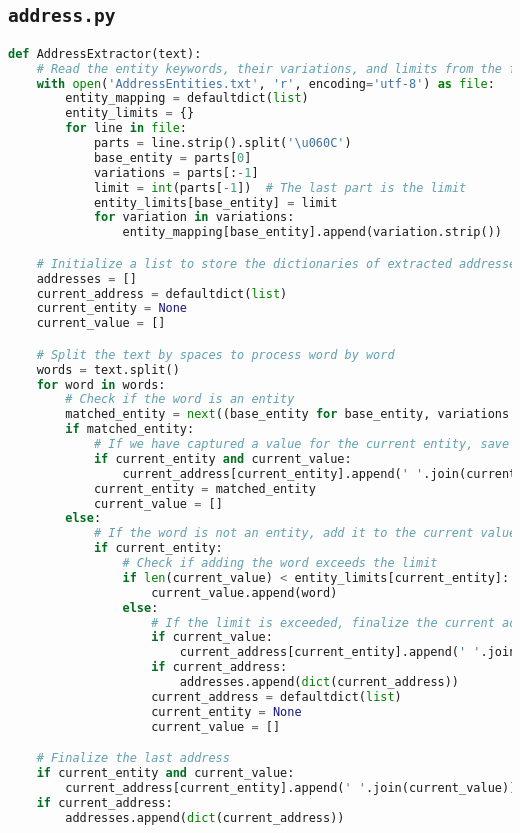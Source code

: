 \documentclass{solutionclass} %
\def\co#1{\texttt{#1}}
\begin{document}
\subsection*{\co{address.py}}
\begin{lstlisting}[language=Python]
def AddressExtractor(text):
    # Read the entity keywords, their variations, and limits from the file
    with open('AddressEntities.txt', 'r', encoding='utf-8') as file:
        entity_mapping = defaultdict(list)
        entity_limits = {}
        for line in file:
            parts = line.strip().split('\u060C')
            base_entity = parts[0]
            variations = parts[:-1]
            limit = int(parts[-1])  # The last part is the limit
            entity_limits[base_entity] = limit
            for variation in variations:
                entity_mapping[base_entity].append(variation.strip())

    # Initialize a list to store the dictionaries of extracted addresses
    addresses = []
    current_address = defaultdict(list)
    current_entity = None
    current_value = []

    # Split the text by spaces to process word by word
    words = text.split()
    for word in words:
        # Check if the word is an entity
        matched_entity = next((base_entity for base_entity, variations in entity_mapping.items() if word in variations), None)
        if matched_entity:
            # If we have captured a value for the current entity, save it
            if current_entity and current_value:
                current_address[current_entity].append(' '.join(current_value))
            current_entity = matched_entity
            current_value = []
        else:
            # If the word is not an entity, add it to the current value
            if current_entity:
                # Check if adding the word exceeds the limit
                if len(current_value) < entity_limits[current_entity]:
                    current_value.append(word)
                else:
                    # If the limit is exceeded, finalize the current address and start a new one
                    if current_value:
                        current_address[current_entity].append(' '.join(current_value))
                    if current_address:
                        addresses.append(dict(current_address))
                    current_address = defaultdict(list)
                    current_entity = None
                    current_value = []

    # Finalize the last address
    if current_entity and current_value:
        current_address[current_entity].append(' '.join(current_value))
    if current_address:
        addresses.append(dict(current_address))


\end{lstlisting}
\end{document}
